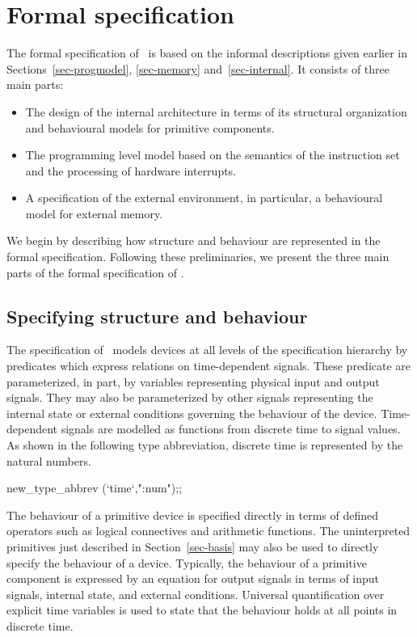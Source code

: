 \section{Formal specification}
\label{sec-spec}

The formal specification of \Tamarack\
is based on the informal descriptions given earlier
in Sections~\ref{sec-progmodel}, \ref{sec-memory} and~\ref{sec-internal}.
It consists of three main parts:

\begin{itemize}
\item The design of the internal architecture in terms of its
structural organization and behavioural models for primitive
components.
\item The programming level model
based on the semantics of the instruction set and the processing
of hardware interrupts.
\item A specification of the external environment,
in particular, a behavioural model for external memory.
\end{itemize}

We begin by describing how structure and behaviour are
represented in the formal specification.
Following these preliminaries,
we present the three main parts of the formal specification
of \Tamarack.

\subsection{Specifying structure and behaviour}

The specification of \Tamarack\ models devices at all
levels of the specification hierarchy by predicates which
express relations on time-dependent signals.
These predicate are parameterized, in part, by variables representing
physical input and output signals.
They may also be parameterized by other signals representing
the internal state or external conditions governing
the behaviour of the device.
Time-dependent signals are modelled
as functions from discrete time to signal values.
As shown in the following
type abbreviation,
discrete time is represented by the natural numbers.

\begintt
new_type_abbrev (`time`,":num");;
\endtt

The behaviour of a primitive device is specified directly
in terms of defined operators such as
logical connectives and arithmetic functions.
The uninterpreted primitives just described in Section~\ref{sec-basis}
may also be used to directly specify the behaviour of a device.
Typically, the behaviour of a primitive component is expressed
by an equation for output signals in terms of input signals,
internal state, and external conditions.
Universal quantification over explicit time variables is
used to state that the behaviour holds at all points in discrete time.

